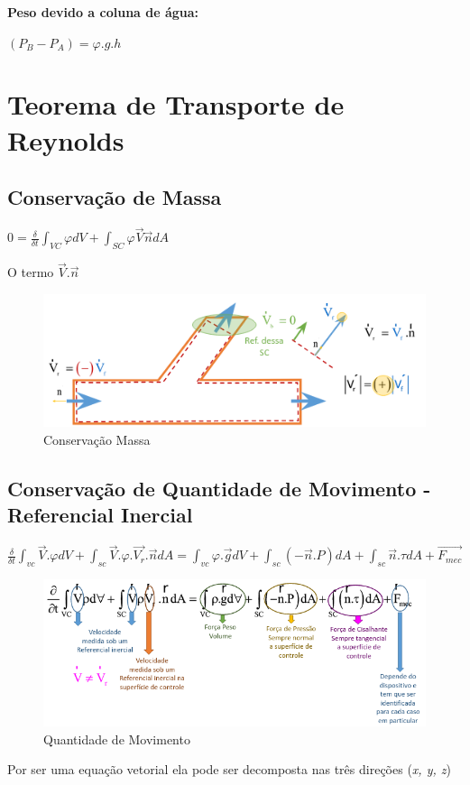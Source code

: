 \documentclass[a4paper, 12pt]{article}
\begin{document}
	\textbf{Peso devido a coluna de água:}
	\begin{center}
		\Large
		$
		(P_{B} - P_{A}) = \varphi .g.h
		$
	\end{center}

\newpage
\section{Teorema de Transporte de Reynolds}
\subsection{Conservação de Massa}
	\begin{center}
		\Large
		$
		0 = \frac{\delta}{\delta t} \int_{VC}\varphi dV + \int_{SC} \varphi \vec{V} \vec{n} dA 
		$
	\end{center}
	O termo $\vec{V}.\vec{n}$
	\begin{figure}[h]
		\centering
		\includegraphics[width=0.7\linewidth]{imagens/rey}
		\caption{Conservação Massa}
		\label{fig:rey}
	\end{figure}
	
\subsection{Conservação de Quantidade de Movimento - Referencial Inercial}
	\begin{center}
		\Large
		$
		\frac{\delta}{\delta t}\int_{vc} \vec{V}.\varphi dV + \int_{sc}\vec{V}. \varphi. \vec{V_{r}}.\vec{n}dA = \int_{vc} \varphi.\vec{g}dV + \int_{sc}(-\vec{n}.P)dA+\int_{sc}\vec{n}.\tau dA + \vec{F_{mec}}
		$
	\end{center}
\begin{figure}[h]
	\centering
	\includegraphics[width=0.5\linewidth]{imagens/eq}
	\caption{Quantidade de Movimento}
	\label{fig:eq}
\end{figure}
	Por ser uma equação vetorial ela pode ser decomposta nas três direções (\textit{x, y, z})
\end{document}
